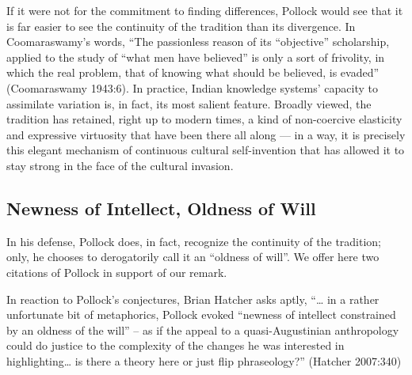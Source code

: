 If it were not for the commitment to finding differences, Pollock would see that it is far easier to see the continuity of the tradition than its divergence. In Coomaraswamy’s words, “The passionless reason of its “objective” scholarship, applied to the study of “what men have believed” is only a sort of frivolity, in which the real problem, that of knowing what should be believed, is evaded” (Coomaraswamy 1943:6). In practice, Indian knowledge systems’ capacity to assimilate variation is, in fact, its most salient feature. Broadly viewed, the tradition has retained, right up to modern times, a kind of non-coercive elasticity and expressive virtuosity that have been there all along — in a way, it is precisely this elegant mechanism of continuous cultural self-invention that has allowed it to stay strong in the face of the cultural invasion.\\[-20pt] 


\subsection{Newness of Intellect, Oldness of Will}%

In his defense, Pollock does, in fact, recognize the continuity of the tradition; only, he chooses to derogatorily call it an “oldness of will”. We offer here two citations of Pollock in support of our remark.
In reaction to Pollock’s conjectures, Brian Hatcher asks aptly, “… in a rather unfortunate bit of metaphorics, Pollock evoked “newness of intellect constrained by an oldness of the will” – as if the appeal to a quasi-Augustinian anthropology could do justice to the complexity of the changes he was interested in highlighting… is there a theory here or just flip phraseology?” (Hatcher 2007:340) 


